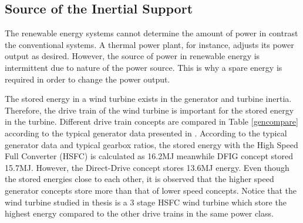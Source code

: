 \subsection{Source of the Inertial Support}
The renewable energy systems cannot determine the amount of power in contrast the conventional systems. A thermal power plant, for instance, adjusts its power output as desired. However, the source of power in renewable energy is intermittent due to nature of the power source. This is why a spare energy is required in order to change the power output.\par
The stored energy in a wind turbine exists in the generator and turbine inertia. Therefore, the drive train of the wind turbine is important for the stored energy in the turbine. Different drive train concepts are compared in Table \ref{gencompare} according to the typical generator data presented in \cite{Seman2011}. According to the typical generator data and typical gearbox ratios, the stored energy with the High Speed Full Converter (HSFC) is calculated as 16.2MJ meanwhile DFIG concept stored 15.7MJ. However, the Direct-Drive concept stores 13.6MJ energy. Even though the stored energies close to each other, it is observed that the higher speed generator concepts store more than that of lower speed concepts. Notice that the wind turbine studied in thesis is a 3 stage HSFC wind turbine which store the highest energy compared to the other drive trains in the same power class.
